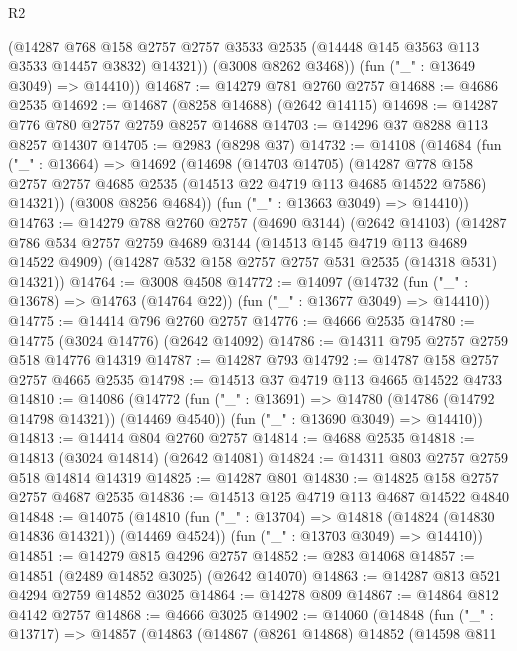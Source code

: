 \begin{lexlean}{R2}
\begin{coremodule}
          (@14287
            @768
            @158
            @2757
            @2757
            @3533
            @2535
            (@14448 @145 @3563 @113 @3533 @14457 @3832)
            @14321))
        (@3008 @8262 @3468))
      (fun ("_" : @13649 @3049) => @14410))
@14687 := @14279 @781 @2760 @2757
@14688 := @4686 @2535
@14692 := @14687 (@8258 @14688) (@2642 @14115)
@14698 := @14287 @776 @780 @2757 @2759 @8257 @14688
@14703 := @14296 @37 @8288 @113 @8257 @14307
@14705 := @2983 (@8298 @37)
@14732 := @14108
    (@14684
      (fun ("_" : @13664) =>
      @14692
        (@14698
          (@14703 @14705)
          (@14287
            @778
            @158
            @2757
            @2757
            @4685
            @2535
            (@14513 @22 @4719 @113 @4685 @14522 @7586)
            @14321))
        (@3008 @8256 @4684))
      (fun ("_" : @13663 @3049) => @14410))
@14763 := @14279
    @788
    @2760
    @2757
    (@4690 @3144)
    (@2642 @14103)
    (@14287
      @786
      @534
      @2757
      @2759
      @4689
      @3144
      (@14513 @145 @4719 @113 @4689 @14522 @4909)
      (@14287 @532 @158 @2757 @2757 @531 @2535 (@14318 @531) @14321))
@14764 := @3008 @4508
@14772 := @14097
    (@14732 (fun ("_" : @13678) => @14763 (@14764 @22)) (fun ("_" : @13677 @3049) => @14410))
@14775 := @14414 @796 @2760 @2757
@14776 := @4666 @2535
@14780 := @14775 (@3024 @14776) (@2642 @14092)
@14786 := @14311 @795 @2757 @2759 @518 @14776 @14319
@14787 := @14287 @793
@14792 := @14787 @158 @2757 @2757 @4665 @2535
@14798 := @14513 @37 @4719 @113 @4665 @14522 @4733
@14810 := @14086
    (@14772
      (fun ("_" : @13691) => @14780 (@14786 (@14792 @14798 @14321)) (@14469 @4540))
      (fun ("_" : @13690 @3049) => @14410))
@14813 := @14414 @804 @2760 @2757
@14814 := @4688 @2535
@14818 := @14813 (@3024 @14814) (@2642 @14081)
@14824 := @14311 @803 @2757 @2759 @518 @14814 @14319
@14825 := @14287 @801
@14830 := @14825 @158 @2757 @2757 @4687 @2535
@14836 := @14513 @125 @4719 @113 @4687 @14522 @4840
@14848 := @14075
    (@14810
      (fun ("_" : @13704) => @14818 (@14824 (@14830 @14836 @14321)) (@14469 @4524))
      (fun ("_" : @13703 @3049) => @14410))
@14851 := @14279 @815 @4296 @2757
@14852 := @283 @14068
@14857 := @14851 (@2489 @14852 @3025) (@2642 @14070)
@14863 := @14287 @813 @521 @4294 @2759 @14852 @3025
@14864 := @14278 @809
@14867 := @14864 @812 @4142 @2757
@14868 := @4666 @3025
@14902 := @14060
    (@14848
      (fun ("_" : @13717) =>
      @14857
        (@14863
          (@14867
            (@8261 @14868)
            @14852
            (@14598
              @811

\end{coremodule}
\end{lexlean}
